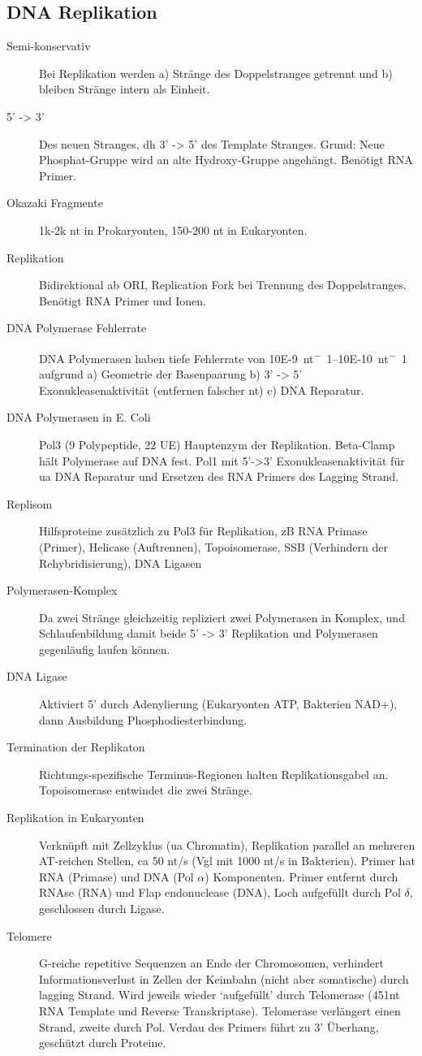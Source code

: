 \documentclass[a4paper,twocolumn,usegeometry,english,fontsize=5,DIV=28]{scrartcl}
\begin{document}
\subsection{DNA Replikation}
\begin{description}
	\item[Semi-konservativ] Bei Replikation werden a) Stränge des
		Doppelstranges getrennt und b) bleiben Stränge intern als
		Einheit.
	\item[5' -> 3'] Des neuen Stranges, dh 3' -> 5' des Template Stranges.
		Grund: Neue Phosphat-Gruppe wird an alte Hydroxy-Gruppe
		angehängt. Benötigt RNA Primer.
	\item[Okazaki Fragmente] 1k-2k nt in Prokaryonten, 150-200 nt in
		Eukaryonten.
	\item[Replikation] Bidirektional ab ORI, Replication Fork bei Trennung
		des Doppelstranges. Benötigt RNA Primer und  Ionen.
	\item[DNA Polymerase Fehlerrate] DNA Polymerasen haben tiefe Fehlerrate
		von \SIrange{10E-9}{10E-10}{nt^-1} aufgrund a) Geometrie der
		Basenpaarung b) 3' -> 5' Exonukleasenaktivität (entfernen
		falscher nt) c) DNA Reparatur.
	\item[DNA Polymerasen in E. Coli] Pol3 (9 Polypeptide, 22 UE)
		Hauptenzym der Replikation. Beta-Clamp hält Polymerase auf DNA
		fest. Pol1 mit 5'->3' Exonukleasenaktivität für ua DNA
		Reparatur und Ersetzen des RNA Primers des Lagging Strand.
	\item[Replisom] Hilfsproteine zusätzlich zu Pol3 für Replikation, zB
		RNA Primase (Primer), Helicase (Auftrennen), Topoisomerase, SSB
		(Verhindern der Rehybridisierung), DNA Ligasen
	\item[Polymerasen-Komplex] Da zwei Stränge gleichzeitig repliziert zwei
		Polymerasen in Komplex, und Schlaufenbildung damit beide 5' ->
		3' Replikation und Polymerasen gegenläufig laufen können.
	\item[DNA Ligase] Aktiviert 5' durch Adenylierung (Eukaryonten ATP,
		Bakterien NAD+), dann Ausbildung Phosphodiesterbindung.
	\item[Termination der Replikaton] Richtungs-spezifische
		Terminus-Regionen halten Replikationsgabel an. Topoisomerase
		entwindet die zwei Stränge.
	\item[Replikation in Eukaryonten] Verknüpft mit Zellzyklus (ua
		Chromatin), Replikation parallel an mehreren AT-reichen
		Stellen, ca 50 nt/s (Vgl mit 1000 nt/s in Bakterien). Primer
		hat RNA (Primase) und DNA (Pol $\alpha$) Komponenten. Primer
		entfernt durch RNAse (RNA) und Flap endonuclease (DNA), Loch
		aufgefüllt durch Pol $\delta$, geschlossen durch Ligase.
	\item[Telomere] G-reiche repetitive Sequenzen an Ende der Chromosomen,
		verhindert Informationsverlust in Zellen der Keimbahn (nicht
		aber somatische) durch lagging Strand. Wird jeweils wieder
		`aufgefüllt' durch Telomerase (451nt RNA Template und Reverse
		Transkriptase).  Telomerase verlängert einen Strand, zweite
		durch Pol. Verdau des Primers führt zu 3' Überhang, geschützt
		durch Proteine.
\end{description}
\end{document}
